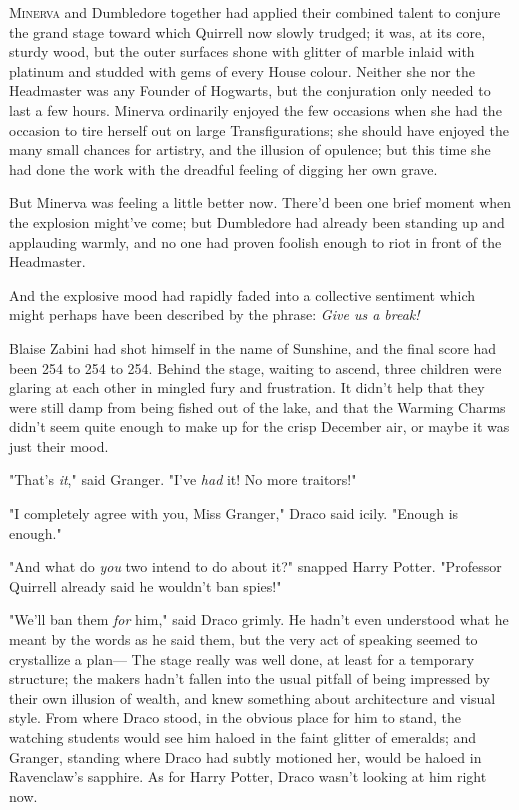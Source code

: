 
\lettrine{M}{inerva} and
Dumbledore together had applied their combined talent to conjure the grand
stage toward which Quirrell now slowly trudged; it was, at its core, sturdy
wood, but the outer surfaces shone with glitter of marble inlaid with platinum
and studded with gems of every House colour. Neither she nor the Headmaster was
any Founder of Hogwarts, but the conjuration only needed to last a few hours.
Minerva ordinarily enjoyed the few occasions when she had the occasion to tire
herself out on large Transfigurations; she should have enjoyed the many small
chances for artistry, and the illusion of opulence; but this time she had done
the work with the dreadful feeling of digging her own grave.

But Minerva was feeling a little better now. There'd been one brief moment when
the explosion might've come; but Dumbledore had already been standing up and
applauding warmly, and no one had proven foolish enough to riot in front of the
Headmaster.

And the explosive mood had rapidly faded into a collective sentiment which
might perhaps have been described by the phrase: \emph{Give us a break!}

Blaise Zabini had shot himself in the name of Sunshine, and the final score had
been 254 to 254 to 254.
\later
Behind the stage, waiting to ascend, three children were glaring at each other
in mingled fury and frustration. It didn't help that they were still damp from
being fished out of the lake, and that the Warming Charms didn't seem quite
enough to make up for the crisp December air, or maybe it was just their mood.

"That's \emph{it}," said Granger. "I've \emph{had} it! No more traitors!"

"I completely agree with you, Miss Granger," Draco said icily. "Enough is
enough."

"And what do \emph{you} two intend to do about it?" snapped Harry Potter.
"Professor Quirrell already said he wouldn't ban spies!"

"We'll ban them \emph{for} him," said Draco grimly. He hadn't even understood
what he meant by the words as he said them, but the very act of speaking seemed
to crystallize a plan---
\later
The stage really was well done, at least for a temporary structure; the makers
hadn't fallen into the usual pitfall of being impressed by their own illusion
of wealth, and knew something about architecture and visual style. From where
Draco stood, in the obvious place for him to stand, the watching students would
see him haloed in the faint glitter of emeralds; and Granger, standing where
Draco had subtly motioned her, would be haloed in Ravenclaw's sapphire. As for
Harry Potter, Draco wasn't looking at him right now.

